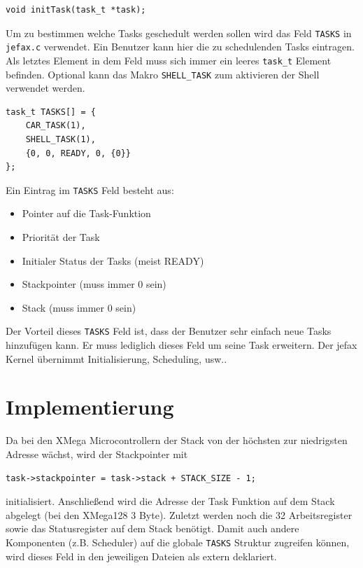 \documentclass[fontsize=12pt, toc=bibliography, notitlepage]{scrreprt}
\begin{document}
\begin{lstlisting}
void initTask(task_t *task);
\end{lstlisting}

Um zu bestimmen welche Tasks geschedult werden sollen wird das Feld \lstinline$TASKS$ in\\ \lstinline$jefax.c$ verwendet. Ein Benutzer kann hier die zu schedulenden Tasks eintragen. Als letztes Element in dem Feld muss sich immer ein leeres \lstinline$task_t$ Element befinden. Optional kann das Makro \lstinline$SHELL_TASK$ zum aktivieren der Shell verwendet werden.

\begin{lstlisting}[title=jefax.c]
task_t TASKS[] = {
    CAR_TASK(1),
    SHELL_TASK(1),
    {0, 0, READY, 0, {0}}
};
\end{lstlisting}

Ein Eintrag im \lstinline$TASKS$ Feld besteht aus:

\begin{itemize}
\item Pointer auf die Task-Funktion
\item Priorität der Task
\item Initialer Status der Tasks (meist READY)
\item Stackpointer (muss immer 0 sein)
\item Stack (muss immer {0} sein)
\end{itemize}

Der Vorteil dieses \lstinline$TASKS$ Feld ist, dass der Benutzer sehr einfach neue Tasks hinzufügen kann. Er muss lediglich dieses Feld um seine Task erweitern. Der jefax Kernel übernimmt Initialisierung, Scheduling, usw..

\section{Implementierung}
\label{subsec:tasks-impl}
Da bei den XMega Microcontrollern der Stack von der höchsten zur niedrigsten Adresse wächst, wird der Stackpointer mit

\begin{lstlisting}
task->stackpointer = task->stack + STACK_SIZE - 1;
\end{lstlisting}

initialisiert. Anschließend wird die Adresse der Task Funktion auf dem Stack abgelegt (bei den XMega128 3 Byte). Zuletzt werden noch die 32 Arbeitsregister sowie das Statusregister auf dem Stack benötigt. Damit auch andere Komponenten (z.B. Scheduler) auf die globale \lstinline$TASKS$ Struktur zugreifen können, wird dieses Feld in den jeweiligen Dateien als extern deklariert.
\end{document}
